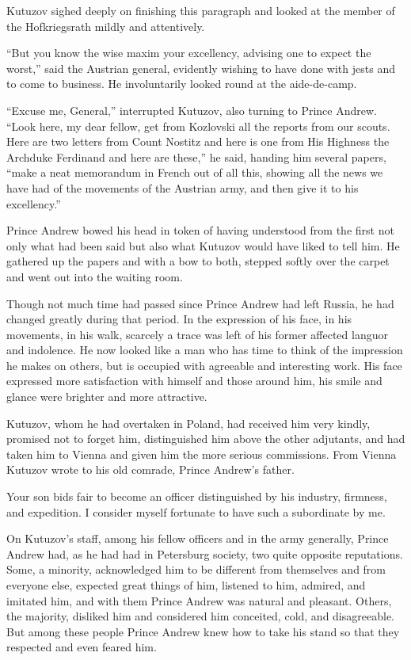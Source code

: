Kutuzov sighed deeply on finishing this paragraph and looked at
the member of the Hofkriegsrath mildly and attentively.

``But you know the wise maxim your excellency, advising one to
expect the worst,'' said the Austrian general, evidently wishing
to have done with jests and to come to business. He involuntarily
looked round at the aide-de-camp.

``Excuse me, General,'' interrupted Kutuzov, also turning to
Prince Andrew. ``Look here, my dear fellow, get from Kozlovski
all the reports from our scouts. Here are two letters from Count
Nostitz and here is one from His Highness the Archduke Ferdinand
and here are these,'' he said, handing him several papers, ``make
a neat memorandum in French out of all this, showing all the news
we have had of the movements of the Austrian army, and then give
it to his excellency.''

Prince Andrew bowed his head in token of having understood from
the first not only what had been said but also what Kutuzov would
have liked to tell him. He gathered up the papers and with a bow
to both, stepped softly over the carpet and went out into the
waiting room.

Though not much time had passed since Prince Andrew had left
Russia, he had changed greatly during that period. In the
expression of his face, in his movements, in his walk, scarcely a
trace was left of his former affected languor and indolence. He
now looked like a man who has time to think of the impression he
makes on others, but is occupied with agreeable and interesting
work. His face expressed more satisfaction with himself and those
around him, his smile and glance were brighter and more
attractive.

Kutuzov, whom he had overtaken in Poland, had received him very
kindly, promised not to forget him, distinguished him above the
other adjutants, and had taken him to Vienna and given him the
more serious commissions.  From Vienna Kutuzov wrote to his old
comrade, Prince Andrew's father.

Your son bids fair to become an officer distinguished by his
industry, firmness, and expedition. I consider myself fortunate
to have such a subordinate by me.

On Kutuzov's staff, among his fellow officers and in the army
generally, Prince Andrew had, as he had had in Petersburg
society, two quite opposite reputations. Some, a minority,
acknowledged him to be different from themselves and from
everyone else, expected great things of him, listened to him,
admired, and imitated him, and with them Prince Andrew was
natural and pleasant. Others, the majority, disliked him and
considered him conceited, cold, and disagreeable. But among these
people Prince Andrew knew how to take his stand so that they
respected and even feared him.

